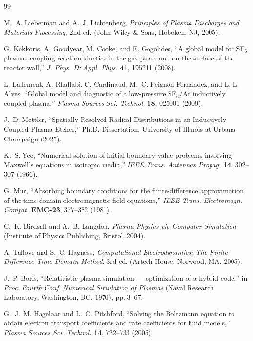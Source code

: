\documentclass[11pt,a4paper]{report}
\begin{document}

\begin{thebibliography}{99}

M.~A. Lieberman and A.~J. Lichtenberg,
\emph{Principles of Plasma Discharges and Materials Processing},
2nd ed. (John Wiley \& Sons, Hoboken, NJ, 2005).

G. Kokkoris, A. Goodyear, M. Cooke, and E. Gogolides,
``A global model for SF$_6$ plasmas coupling reaction kinetics in the gas phase and on the surface of the reactor wall,''
\emph{J. Phys. D: Appl. Phys.} \textbf{41}, 195211 (2008).

L. Lallement, A. Rhallabi, C. Cardinaud, M.~C. Peignon-Fernandez, and L. L. Alves,
``Global model and diagnostic of a low-pressure SF$_6$/Ar inductively coupled plasma,''
\emph{Plasma Sources Sci. Technol.} \textbf{18}, 025001 (2009).

J.~D. Mettler,
``Spatially Resolved Radical Distributions in an Inductively Coupled Plasma Etcher,''
Ph.D. Dissertation, University of Illinois at Urbana-Champaign (2025).

K.~S. Yee,
``Numerical solution of initial boundary value problems involving Maxwell's equations in isotropic media,''
\emph{IEEE Trans. Antennas Propag.} \textbf{14}, 302--307 (1966).

G. Mur,
``Absorbing boundary conditions for the finite-difference approximation of the time-domain electromagnetic-field equations,''
\emph{IEEE Trans. Electromagn. Compat.} \textbf{EMC-23}, 377--382 (1981).

C.~K. Birdsall and A.~B. Langdon,
\emph{Plasma Physics via Computer Simulation}
(Institute of Physics Publishing, Bristol, 2004).

A. Taflove and S.~C. Hagness,
\emph{Computational Electrodynamics: The Finite-Difference Time-Domain Method},
3rd ed. (Artech House, Norwood, MA, 2005).

J.~P. Boris,
``Relativistic plasma simulation --- optimization of a hybrid code,''
in \emph{Proc. Fourth Conf. Numerical Simulation of Plasmas}
(Naval Research Laboratory, Washington, DC, 1970), pp. 3--67.

G.~J.~M. Hagelaar and L.~C. Pitchford,
``Solving the Boltzmann equation to obtain electron transport coefficients and rate coefficients for fluid models,''
\emph{Plasma Sources Sci. Technol.} \textbf{14}, 722--733 (2005).


\end{thebibliography}
\end{document}
